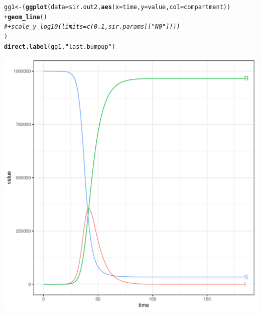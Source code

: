 \documentclass{article}\usepackage[]{graphicx}\usepackage[]{color}
\makeatletter
\def\maxwidth{ %
  \ifdim\Gin@nat@width>\linewidth
    \linewidth
  \else
    \Gin@nat@width
  \fi
}
\newcommand{\hlstr}[1]{\textcolor[rgb]{0.192,0.494,0.8}{#1}}%
\newcommand{\hlcom}[1]{\textcolor[rgb]{0.678,0.584,0.686}{\textit{#1}}}%
\newcommand{\hlopt}[1]{\textcolor[rgb]{0,0,0}{#1}}%
\newcommand{\hlstd}[1]{\textcolor[rgb]{0.345,0.345,0.345}{#1}}%
\newcommand{\hlkwb}[1]{\textcolor[rgb]{0.69,0.353,0.396}{#1}}%
\newcommand{\hlkwc}[1]{\textcolor[rgb]{0.333,0.667,0.333}{#1}}%
\newcommand{\hlkwd}[1]{\textcolor[rgb]{0.737,0.353,0.396}{\textbf{#1}}}%
\newenvironment{kframe}{%
 \def\at@end@of@kframe{}%
 \ifinner\ifhmode%
  \def\at@end@of@kframe{\end{minipage}}%
  \begin{minipage}{\columnwidth}%
 \fi\fi%
 \def\FrameCommand##1{\hskip\@totalleftmargin \hskip-\fboxsep
 \colorbox{shadecolor}{##1}\hskip-\fboxsep
     \hskip-\linewidth \hskip-\@totalleftmargin \hskip\columnwidth}%
 \MakeFramed {\advance\hsize-\width
   \@totalleftmargin\z@ \linewidth\hsize
   \@setminipage}}%
 {\par\unskip\endMakeFramed%
 \at@end@of@kframe}
\newenvironment{knitrout}{}{} %
\makeatother
\begin{document}
\begin{knitrout}
\begin{kframe}
\begin{alltt}
\hlstd{gg1} \hlkwb{<-} \hlstd{(}\hlkwd{ggplot}\hlstd{(}\hlkwc{data}\hlstd{=sir.out2,} \hlkwd{aes}\hlstd{(}\hlkwc{x}\hlstd{=time,}\hlkwc{y}\hlstd{=value,}\hlkwc{col}\hlstd{=compartment))}
    \hlopt{+} \hlkwd{geom_line}\hlstd{()}
    \hlcom{# + scale_y_log10(limits=c(0.1,sir.params[["N0"]]))}
\hlstd{)}
\hlkwd{direct.label}\hlstd{(gg1,}\hlstr{"last.bumpup"}\hlstd{)}
\end{alltt}
\end{kframe}
\includegraphics[width=\maxwidth]{figure/Ali:SIR_-1} 

\end{knitrout}
\end{document}
